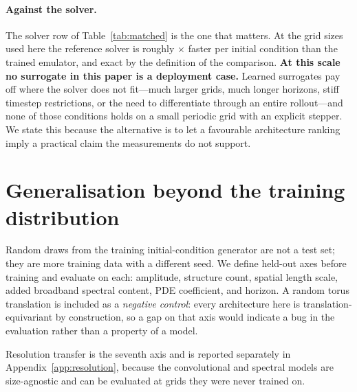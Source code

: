 \documentclass{article}
\begin{document}
\paragraph{Against the solver.} The solver row of Table~\ref{tab:matched} is the one that
matters. At the grid sizes used here the reference solver is roughly
\matchedSolverSpeedup$\times$ faster per initial condition than the trained emulator, and
exact by the definition of the comparison. \textbf{At this scale no surrogate in this paper
is a deployment case.} Learned surrogates pay off where the solver does not fit---much
larger grids, much longer horizons, stiff timestep restrictions, or the need to
differentiate through an entire rollout---and none of those conditions holds on a small
periodic grid with an explicit stepper. We state this because the alternative is to let a
favourable architecture ranking imply a practical claim the measurements do not support.

\section{Generalisation beyond the training distribution}
\label{sec:ood}

Random draws from the training initial-condition generator are not a test set; they are
more training data with a different seed. We define held-out axes before training and
evaluate on each: amplitude, structure count, spatial length scale, added broadband
spectral content, PDE coefficient, and horizon. A random torus translation is included as
a \emph{negative control}: every architecture here is translation-equivariant by
construction, so a gap on that axis would indicate a bug in the evaluation rather than a
property of a model.

\begin{table}[h]
\centering
\caption{Out-of-distribution degradation on heat, as the ratio of the shifted-axis error
to the in-distribution error. $1.00\times$ is perfect transfer. Bold entries have at least
one initial condition whose relative $L_2$ exceeds 1, i.e.\ worse than predicting no
change.}
\label{tab:ood}
\small

\end{table}

Resolution transfer is the seventh axis and is reported separately in
Appendix~\ref{app:resolution}, because the convolutional and spectral models are
size-agnostic and can be evaluated at grids they were never trained on.
\end{document}
